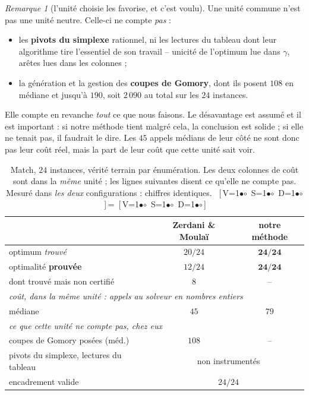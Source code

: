 \documentclass[11pt,a4paper]{article}
\theoremstyle{plain}
\theoremstyle{remark}
\newtheorem{remark}{Remarque}
\newcommand{\cfgm}[1]{\ifnum#1=1$\bullet$\else$\circ$\fi}
\newcommand{\conf}[3]{%
  \textsf{\footnotesize[\,V\cfgm{#1}\ S\cfgm{#2}\ D\cfgm{#3}\,]}}
\begin{document}
\begin{remark}[l'unité choisie les favorise, et c'est voulu]
Une unité commune n'est pas une unité neutre. Celle-ci ne compte
\emph{pas} :
\begin{itemize}[leftmargin=*,itemsep=1pt]
\item les \textbf{pivots du simplexe} rationnel, ni les lectures du
  tableau dont leur algorithme tire l'essentiel de son travail -- unicité
  de l'optimum lue dans $\gamma$, arêtes lues dans les colonnes ;
\item la génération et la gestion des \textbf{coupes de Gomory}, dont ils
  posent $108$ en médiane et jusqu'à $190$, soit $2\,090$ au total sur les
  $24$ instances.
\end{itemize}
Elle compte en revanche \emph{tout} ce que nous faisons. Le désavantage est
assumé et il est important : si notre méthode tient malgré cela, la
conclusion est solide ; si elle ne tenait pas, il faudrait le dire. Les
$45$ appels médians de leur côté ne sont donc pas leur coût réel, mais la
part de leur coût que cette unité sait voir.
\end{remark}

\begin{table}[H]
\centering
\caption{Match, $24$ instances, vérité terrain par énumération. Les deux
colonnes de coût sont dans la \emph{même} unité ; les lignes suivantes
disent ce qu'elle ne compte pas. Mesuré dans \emph{les deux}
configurations : chiffres identiques.\
\conf{0}{0}{0}\,=\,\conf{1}{1}{1}}
\label{tab:match}
\begin{tabular}{lcc}
\toprule
& Zerdani \& Moulaï & notre méthode\\
\midrule
optimum \emph{trouvé} & $20/24$ & $\mathbf{24/24}$\\
optimalité \textbf{prouvée} & $12/24$ & $\mathbf{24/24}$\\
\quad dont trouvé mais non certifié & $8$ & --\\
\midrule
\multicolumn{3}{l}{\emph{coût, dans la même unité : appels au solveur en
 nombres entiers}}\\
médiane & $45$ & $79$\\
\midrule
\multicolumn{3}{l}{\emph{ce que cette unité ne compte pas, chez eux}}\\
coupes de Gomory posées (méd.) & $108$ & --\\
pivots du simplexe, lectures du tableau
 & \multicolumn{2}{c}{non instrumentés}\\
\midrule
encadrement valide & \multicolumn{2}{c}{$24/24$}\\
\bottomrule
\end{tabular}
\end{table}
\end{document}

